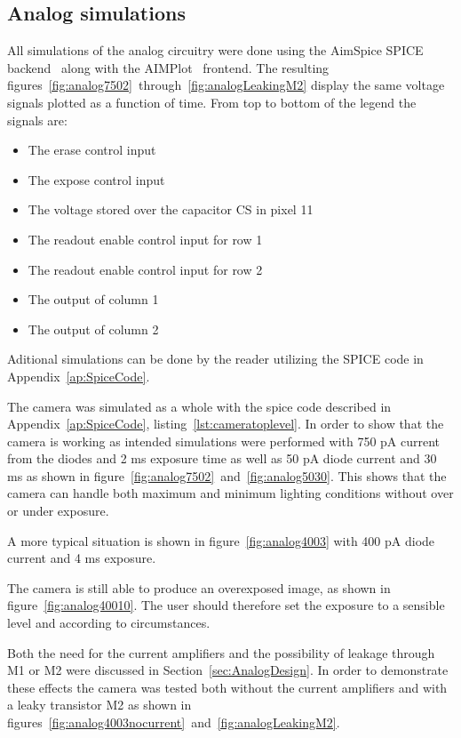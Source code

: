 \subsection{Analog simulations} \label{sec:analogSimulations}

All simulations of the analog circuitry were done using the AimSpice SPICE backend~\cite{AIMSpice} along with the AIMPlot~\cite{aimplot} frontend.
The resulting figures~\ref{fig:analog7502}~through~\ref{fig:analogLeakingM2} display the same voltage signals plotted as a function of time.
From top to bottom of the legend the signals are:
\begin{itemize}
\item The erase control input
\item The expose control input
\item The voltage stored over the capacitor CS in pixel 11
\item The readout enable control input for row 1
\item The readout enable control input for row 2
\item The output of column 1
\item The output of column 2
\end{itemize}

Aditional simulations can be done by the reader utilizing the SPICE code in Appendix~\ref{ap:SpiceCode}.

The camera was simulated as a whole with the spice code described in Appendix~\ref{ap:SpiceCode}, listing~\ref{lst:cameratoplevel}.
In order to show that the camera is working as intended simulations were performed with 750 pA current from the diodes and 2 ms exposure time as well as 50 pA diode current and 30 ms as shown in figure~\ref{fig:analog7502}~and~\ref{fig:analog5030}.
This shows that the camera can handle both maximum and minimum lighting conditions without over or under exposure.

A more typical situation is shown in figure~\ref{fig:analog4003} with 400 pA diode current and 4 ms exposure.

The camera is still able to produce an overexposed image, as shown in figure~\ref{fig:analog40010}. The user should therefore set the exposure to a sensible level and according to circumstances.

Both the need for the current amplifiers and the possibility of leakage through M1 or M2 were discussed in Section~\ref{sec:AnalogDesign}.
In order to demonstrate these effects the camera was tested both without the current amplifiers and with a leaky transistor M2 as shown in figures~\ref{fig:analog4003nocurrent}~and~\ref{fig:analogLeakingM2}.

